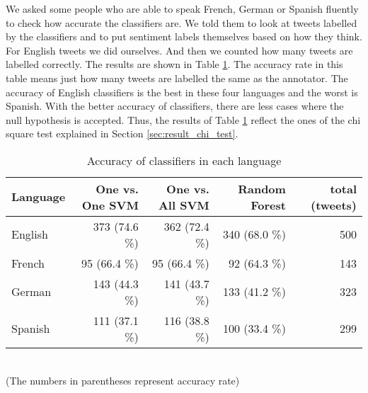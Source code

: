 We asked some people who are able to speak French, German or Spanish fluently to check how accurate the classifiers are.
We told them to look at tweets labelled by the classifiers and to put sentiment labels themselves based on how they think. 
For English tweets we did ourselves.
And then we counted how many tweets are labelled correctly.
The results are shown in Table \ref{tab:accuracy}. 
The accuracy rate in this table means just how many tweets are labelled the same as the annotator.
The accuracy of English classifiers is the best in these four languages and the worst is Spanish.
With the better accuracy of classifiers, there are less cases where the null hypothesis is accepted.
Thus, the results of Table \ref{tab:accuracy} reflect the ones of the chi square test explained in Section \ref{sec:result_chi_test}.
\begin{table}[ht]
	\caption{Accuracy of classifiers in each language}
	\begin{tabular}{|l|r|r|r|r|} \hline
	Language &One vs. One SVM &One vs. All SVM&Random Forest & total (tweets)\\ \hline
	English & 373 (74.6 \%) & 362 (72.4 \%)& 340 (68.0 \%)& 500\\ \hline
	French & 95 (66.4 \%)  & 95 (66.4 \%)& 92 (64.3 \%)& 143 \\ \hline
	German & 143 (44.3 \%)& 141 (43.7 \%)& 133 (41.2 \%)& 323 \\ \hline
	Spanish & 111 (37.1 \%)& 116 (38.8 \%)& 100 (33.4 \%)& 299 \\ \hline
	\end{tabular}
	\label{tab:accuracy}
	\\ (The numbers in parentheses represent accuracy rate)
\end{table}

\begin{comment}
The other values of this combination are also smaller (9.268 and 16.687) compared to the other ones, in which some of the $\chi^2$ statistics are more than a hundred or even a thousand.
An interesting thing is that the $\chi^2$ statistics of the two cities in Spain, Barcelona and Madrid are small too (18.855, 13.669 and 11.606).
But it is not applied to the case of the two cities in Germany (302.720, 359.948 and 80.490) but the case of the two German-Speaking cities, Hamburg and Vienna (30.195, 36.876 and 19.382).
So far this outcome shows that the distributions of sentiment value between two cities are not independent of location almost all of the case in the experiment.
Thus, we can conclude the classifiers trained by the training dataset work well to perform a sentiment analysis by city.
\end{comment}


